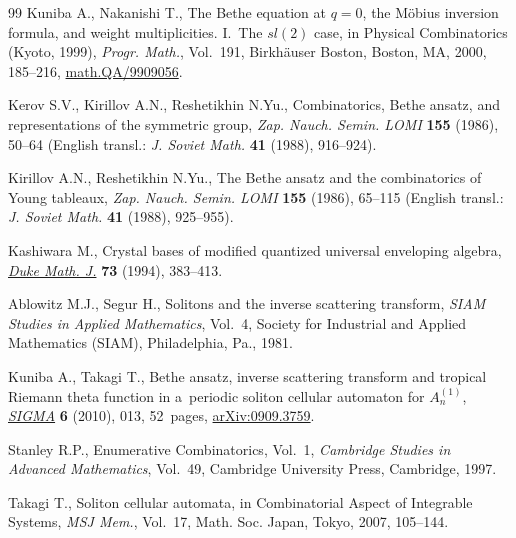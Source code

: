 \documentclass[pdftex]{sigma}
\begin{document}
\begin{thebibliography}{99}
Kuniba A., Nakanishi T.,
The Bethe equation at $q=0$, the M\"obius inversion formula, and weight multipli\-ci\-ties. I.~The $sl(2)$ case,
in Physical Combinatorics (Kyoto, 1999), {\it  Progr. Math.}, Vol.~191, Birkh\"auser Boston, Boston, MA, 2000, 185--216,
\href{http://arxiv.org/abs/math.QA/9909056}{math.QA/9909056}.

Kerov S.V., Kirillov A.N., Reshetikhin N.Yu.,
Combinatorics, Bethe ansatz, and representations of the symmetric group,
{\it Zap. Nauch. Semin. LOMI} {\bf 155} (1986), 50--64 (English transl.: {\it J. Soviet Math.} {\bf 41} (1988),  916--924).

Kirillov A.N., Reshetikhin N.Yu.,
The Bethe ansatz and the combinatorics of Young tableaux,
{\it Zap. Nauch. Semin. LOMI} {\bf 155} (1986), 65--115
(English transl.: {\it J. Soviet Math.} {\bf 41} (1988), 925--955).


Kashiwara M.,
Crystal bases of modif\/ied quantized universal enveloping algebra,
\href{http://dx.doi.org/10.1215/S0012-7094-94-07317-1}{{\it Duke  Math. J.}}  {\bf 73} (1994), 383--413.


Ablowitz M.J., Segur H.,
Solitons and the inverse scattering transform,
{\it SIAM Studies in Applied Mathematics}, Vol.~4, Society for Industrial and Applied Mathematics (SIAM), Philadelphia, Pa., 1981.


Kuniba A., Takagi T.,
Bethe ansatz, inverse scattering transform and tropical Riemann theta function in a~periodic soliton cellular automaton for $A^{(1)}_n$,
\href{http://dx.doi.org/10.3842/SIGMA.2010.013}{{\it SIGMA}} {\bf 6} (2010), 013, 52~pages,
\href{http://arxiv.org/abs/0909.3759}{arXiv:0909.3759}.


Stanley R.P.,
Enumerative Combinatorics, Vol.~1,
{\it Cambridge Studies in Advanced Mathematics}, Vol.~49, Cambridge University Press, Cambridge, 1997.



Takagi T.,
Soliton cellular automata,
in  Combinatorial Aspect of Integrable Systems,
{\it MSJ Mem.}, Vol.~17, Math. Soc. Japan, Tokyo, 2007, 105--144.


\end{thebibliography}\LastPageEnding
\end{document}
